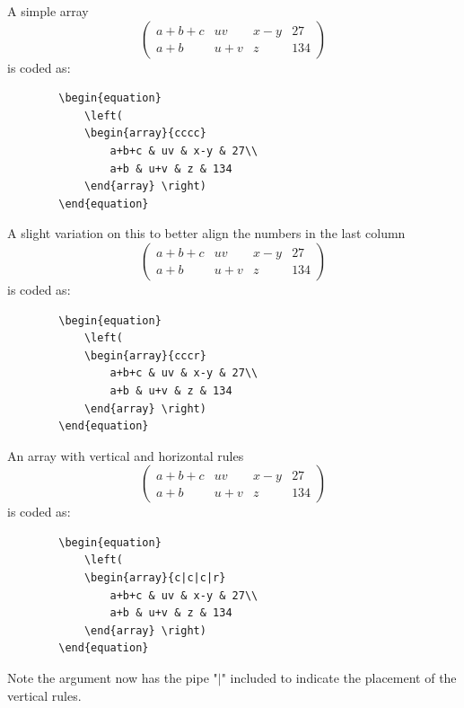 \documentclass[lettersize,journal]{IEEEtran}
\begin{document}
	A simple array
	\begin{equation}
		\left(
		\begin{array}{cccc}
			a+b+c & uv & x-y & 27\\
			a+b & u+v & z & 134
		\end{array}\right)
	\end{equation}
	is coded as:
	\begin{verbatim}
		\begin{equation}
			\left(
			\begin{array}{cccc}
				a+b+c & uv & x-y & 27\\
				a+b & u+v & z & 134
			\end{array} \right)
		\end{equation}
	\end{verbatim}
	
	A slight variation on this to better align the numbers in the last column
	\begin{equation}
		\left(
		\begin{array}{cccr}
			a+b+c & uv & x-y & 27\\
			a+b & u+v & z & 134
		\end{array}\right)
	\end{equation}
	is coded as:
	\begin{verbatim}
		\begin{equation}
			\left(
			\begin{array}{cccr}
				a+b+c & uv & x-y & 27\\
				a+b & u+v & z & 134
			\end{array} \right)
		\end{equation}
	\end{verbatim}
	
	An array with vertical and horizontal rules
	\begin{equation}
		\left( \begin{array}{c|c|c|r}
			a+b+c & uv & x-y & 27\\ \hline
			a+b & u+v & z & 134
		\end{array}\right)
	\end{equation}
	is coded as:
	\begin{verbatim}
		\begin{equation}
			\left(
			\begin{array}{c|c|c|r}
				a+b+c & uv & x-y & 27\\
				a+b & u+v & z & 134
			\end{array} \right)
		\end{equation}
	\end{verbatim}
	Note the argument now has the pipe "$\vert$" included to indicate the placement of the vertical rules.
	
\end{document}
